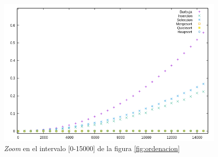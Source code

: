 \documentclass{article}
\begin{document}
	\begin{figure}[H]
		\centering
		\includegraphics[totalheight=8cm]{img/ordenacion_zoom}
		\caption{\textit{Zoom} en el intervalo [0-15000] de la figura \ref{fig:ordenacion}}
		\label{fig:ordenacion_zoom}
	\end{figure}
\end{document}
